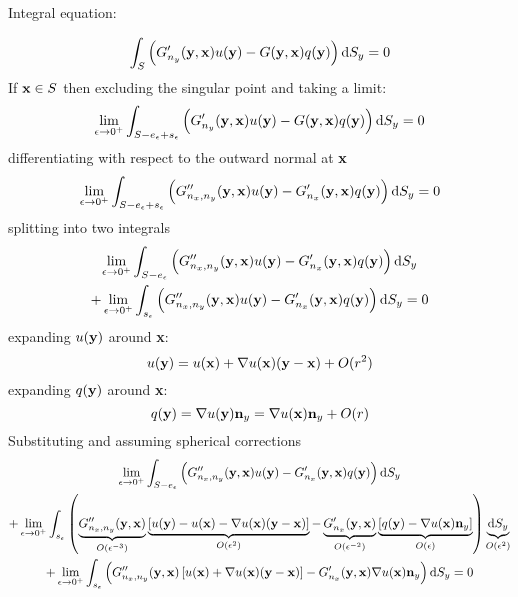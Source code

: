 \documentclass[a4paper,11pt]{article}
\newcommand{\td}{\mathrm{d}}
\begin{document}
Integral equation:

\begin{equation}
\int_{S} \left( G'_{n_y}({\bf y}, {\bf x}) u({\bf y}) - G({\bf y}, {\bf x}) q({\bf y})
\right) \td S_y = 0
\end{equation}
%
If ${\bf x} \in S$ then excluding the singular point and taking a limit:
%
\begin{equation}
\lim_{\epsilon \to 0^+}
\int_{S-e_{\epsilon}+s_{\epsilon}}
\left(
G'_{n_y}({\bf y}, {\bf x}) u({\bf y}) - G({\bf y}, {\bf x}) q({\bf y})
\right) 
\td S_y = 0
\end{equation}
%
differentiating with respect to the outward normal at ${\bf x}$
%
\begin{equation}
\lim_{\epsilon \to 0^+}
\int_{S-e_{\epsilon}+s_{\epsilon}}
\left(
G''_{n_x,n_y}({\bf y}, {\bf x}) u({\bf y}) - G'_{n_x}({\bf y}, {\bf x}) q({\bf y})
\right)
\td S_y = 0
\end{equation}
%
splitting into two integrals
%
\begin{multline}
\lim_{\epsilon \to 0^+}
\int_{S-e_{\epsilon}}
\left(
G''_{n_x,n_y}({\bf y}, {\bf x}) u({\bf y}) - G'_{n_x}({\bf y}, {\bf x}) q({\bf y})
\right)
\td S_y
\\
+
\lim_{\epsilon \to 0^+}
\int_{s_{\epsilon}}
\left(
G''_{n_x,n_y}({\bf y}, {\bf x}) u({\bf y}) - G'_{n_x}({\bf y}, {\bf x}) q({\bf y})
\right)
\td S_y = 0
\end{multline}
%
expanding $u({\bf y})$ around {\bf x}:
%
\begin{equation}
u({\bf y}) = u({\bf x}) + \nabla u({\bf x}) ({\bf y} - {\bf x}) + O(r^2)
\end{equation}
%
expanding $q({\bf y})$ around {\bf x}:
%
\begin{equation}
q({\bf y}) = \nabla u({\bf y}) {\bf n}_y = \nabla u({\bf x}) {\bf n}_y + O(r)
\end{equation}
%
Substituting and assuming spherical corrections
%
\begin{multline}
\lim_{\epsilon \to 0^+}
\int_{S-e_{\epsilon}}
\left(
G''_{n_x,n_y}({\bf y}, {\bf x}) u({\bf y})
- G'_{n_x}({\bf y}, {\bf x}) q({\bf y})
\right)
\td S_y
\\
+
\lim_{\epsilon \to 0^+}
\int_{s_{\epsilon}}
\left(
\underbrace{G''_{n_x,n_y}({\bf y}, {\bf x})}_{O(\epsilon^{-3})} \underbrace{\left[u({\bf y}) - u({\bf x}) - \nabla u({\bf x}) ({\bf y} - {\bf x})\right]}_{O(\epsilon^2)}
- \underbrace{G'_{n_x}({\bf y}, {\bf x})}_{O(\epsilon^{-2})} \underbrace{\left[q({\bf y}) - \nabla u({\bf x}) {\bf n}_y\right]}_{O(\epsilon)}
\right)
\underbrace{\td S_y}_{O(\epsilon^2)}
\\
+
\lim_{\epsilon \to 0^+}
\int_{s_{\epsilon}}
\left(
G''_{n_x,n_y}({\bf y}, {\bf x}) \left[u({\bf x}) + \nabla u({\bf x}) ({\bf y} - {\bf x})\right]
- G'_{n_x}({\bf y}, {\bf x}) \nabla u({\bf x}) {\bf n}_y
\right)
\td S_y = 0
\end{multline}
\end{document}
